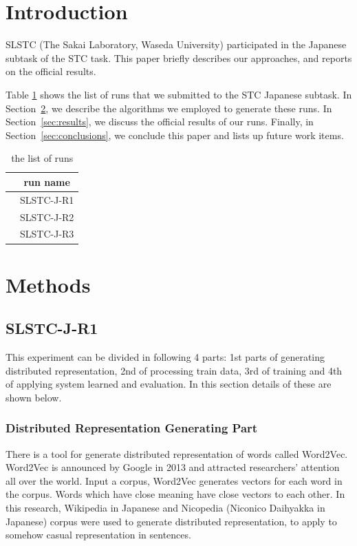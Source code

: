 \documentclass{../style/sig-alternate}
\begin{document}

\section{Introduction}

SLSTC (The Sakai Laboratory, Waseda University) participated in the
Japanese subtask of the STC task.
This paper briefly describes our approaches,
and reports on the official results.

Table \ref{tab:run_list}  shows the list of runs that we submitted to the STC Japanese subtask.
In Section~\ref{sec:methods}, we describe the algorithms we employed
to generate these runs.
In Section~\ref{sec:results}, we discuss the official results of our runs.
Finally, in Section~\ref{sec:conclusions}, we conclude this paper
and lists up future work items.

\begin{table}[h!]
  \centering
  \caption{the list of runs}
  \label{tab:run_list}
  \begin{tabular}{|c|} \hline
    　run name \\ \hline
    　SLSTC-J-R1 \\ \hline
    　SLSTC-J-R2 \\ \hline
    　SLSTC-J-R3 \\ \hline
  \end{tabular}
\end{table}

\section{Methods}
\label{sec:methods}

\subsection{SLSTC-J-R1}

This experiment can be divided in following 4 parts: 1st parts of generating distributed representation, 2nd of processing train data, 3rd of training and 4th of applying system learned and evaluation. In this section details of these are shown below.

\subsubsection{Distributed Representation Generating Part}

There is a tool for generate distributed representation of words called Word2Vec\cite{word2vec}.
Word2Vec is announced by Google in 2013 and attracted researchers’ attention all over the world.
Input a corpus, Word2Vec generates vectors for each word in the corpus.
Words which have close meaning have close vectors to each other.
In this research, Wikipedia in Japanese and Nicopedia (Niconico Daihyakka in Japanese) corpus were used to generate distributed representation, to apply to somehow casual representation in sentences.
\end{document}
